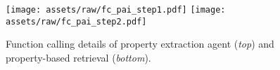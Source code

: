 \begin{figure}
    \centering
    \texttt{[image: assets/raw/fc\_pai\_step1.pdf]}
    \texttt{[image: assets/raw/fc\_pai\_step2.pdf]}
    \caption{Function calling details of property extraction agent (\textit{top}) and property-based retrieval (\textit{bottom}).} \label{fig:pai_fc}
\end{figure}